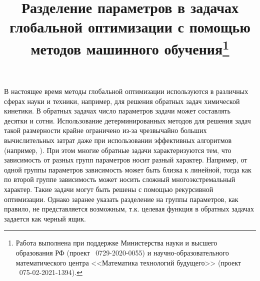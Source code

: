 \documentclass[11pt, oneside, a4paper]{article}
\begin{document}
\setcounter{page}{1}



\title{Разделение параметров в задачах глобальной оптимизации с помощью методов машинного обучения\footnote{Работа выполнена при поддержке Министерства науки и высшего образования РФ (проект \textnumero~0729-2020-0055) и научно-образовательного математического центра <<Математика технологий будущего>> (проект \textnumero~075-02-2021-1394).}}





\bigskip

В настоящее время методы глобальной оптимизации используются в различных сферах науки и техники, например, для решения обратных задач химической кинетики. В обратных задачах число параметров задачи может составлять десятки и сотни. Использование детерминированных методов для решения задач такой размерности крайне ограничено из-за чрезвычайно больших вычислительных затрат даже при использовании эффективных алгоритмов (например, \cite{Paulavicius2011,Evtushenko2009,Jones2009}). 
При этом многие обратные задачи характеризуются тем, что зависимость от разных групп параметров носит разный характер. Например, от одной группы параметров зависимость может быть близка к линейной, тогда как по второй группе зависимость может носить сложный многоэкстремальный характер. Такие задачи могут быть решены с помощью рекурсивной оптимизации. Однако заранее указать разделение на группы параметров, как правило, не представляется возможным, т.к. целевая функция в обратных задачах задается как черный ящик. 
\end{document}
